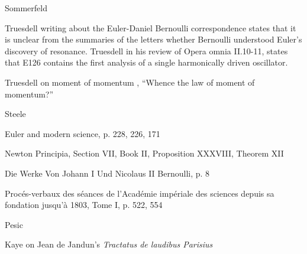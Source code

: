 \documentclass{amsart}
\begin{document}
Sommerfeld \cite{sommerfeld}

Truesdell \cite[p.~309]{truesdell1984} writing about the Euler-Daniel Bernoulli correspondence states that it is unclear from the summaries of the letters whether Bernoulli
understood Euler's discovery of resonance. Truesdell \cite[p.~323]{truesdell1984}  in his review of Opera omnia II.10-11, states that E126 contains the first analysis of a single
harmonically driven oscillator.

Truesdell on moment of momentum \cite[pp.~239--271]{truesdell1968V}, ``Whence the law of moment of momentum?''

Steele \cite[p.~349]{steele}

Euler and modern science, p. 228, 226, 171

Newton Principia, Section VII, Book II, Proposition XXXVIII, Theorem XII

Die Werke Von Johann I Und Nicolaus II Bernoulli, p. 8

Proc\'es-verbaux des s\'eances de l'Acad\'emie imp\'eriale des sciences depuis sa fondation jusqu'\`a 1803, Tome I, p. 522, 554

Pesic \cite[p.~22]{pesic2014}

Kaye \cite[p.~287]{kaye} on Jean de Jandun's {\em Tractatus de laudibus Parisius}

\nocite{*}



\end{document}
